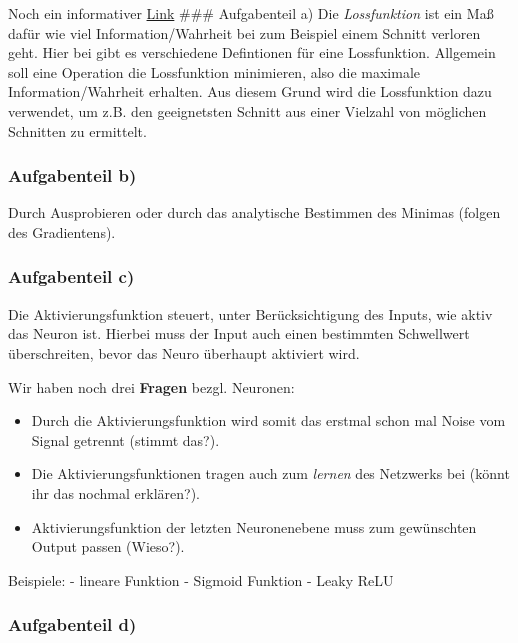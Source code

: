 \documentclass[11pt]{article}
\providecommand{\tightlist}{%
      \setlength{\itemsep}{0pt}\setlength{\parskip}{0pt}}
\begin{document}
Noch ein informativer
\href{http://www.cbcity.de/tutorial-neuronale-netze-einfach-erklaert}{Link}
\#\#\# Aufgabenteil a) Die \emph{Lossfunktion} ist ein Maß dafür wie
viel Information/Wahrheit bei zum Beispiel einem Schnitt verloren geht.
Hier bei gibt es verschiedene Defintionen für eine Lossfunktion.
Allgemein soll eine Operation die Lossfunktion minimieren, also die
maximale Information/Wahrheit erhalten. Aus diesem Grund wird die
Lossfunktion dazu verwendet, um z.B. den geeignetsten Schnitt aus einer
Vielzahl von möglichen Schnitten zu ermittelt.

\hypertarget{aufgabenteil-b}{%
\subsubsection{Aufgabenteil b)}\label{aufgabenteil-b}}

Durch Ausprobieren oder durch das analytische Bestimmen des Minimas
(folgen des Gradientens).

\hypertarget{aufgabenteil-c}{%
\subsubsection{Aufgabenteil c)}\label{aufgabenteil-c}}

Die Aktivierungsfunktion steuert, unter Berücksichtigung des Inputs, wie
aktiv das Neuron ist. Hierbei muss der Input auch einen bestimmten
Schwellwert überschreiten, bevor das Neuro überhaupt aktiviert wird.

Wir haben noch drei \textbf{Fragen} bezgl. Neuronen:

\begin{itemize}
\tightlist
\item
  Durch die Aktivierungsfunktion wird somit das erstmal schon mal Noise
  vom Signal getrennt (stimmt das?).
\item
  Die Aktivierungsfunktionen tragen auch zum \emph{lernen} des Netzwerks
  bei (könnt ihr das nochmal erklären?).
\item
  Aktivierungsfunktion der letzten Neuronenebene muss zum gewünschten
  Output passen (Wieso?).
\end{itemize}

Beispiele: - lineare Funktion - Sigmoid Funktion - Leaky ReLU

\hypertarget{aufgabenteil-d}{%
\subsubsection{Aufgabenteil d)}\label{aufgabenteil-d}}
\end{document}
